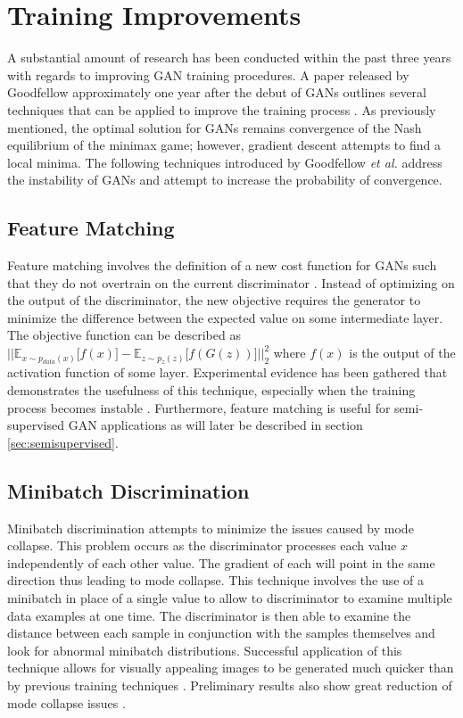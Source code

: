 \documentclass[11pt]{article}
\begin{document}
\section{Training Improvements}
A substantial amount of research has been conducted within the past three years with regards to improving GAN training procedures. A paper released by Goodfellow approximately one year after the debut of GANs outlines several techniques that can be applied to improve the training process \citep{2016arXiv160603498S}. As previously mentioned, the optimal solution for GANs remains convergence of the Nash equilibrium of the minimax game; however, gradient descent attempts to find a local minima. The following techniques introduced by Goodfellow \textit{et al.} address the instability of GANs and attempt to increase the probability of convergence.

\subsection{Feature Matching}
Feature matching involves the definition of a new cost function for GANs such that they do not overtrain on the current discriminator \citep{2016arXiv160603498S}. Instead of optimizing on the output of the discriminator, the new objective requires the generator to minimize the difference between the expected value on some intermediate layer. The objective function can be described as $\Big|\Big|\mathbb{E}_{x\sim p_{data}(x)}\Big[f(x)\Big] - \mathbb{E}_{z\sim p_{z}(z)}\Big[f(G(z))\Big]\Big|\Big|_2^2$ where $f(x)$ is the output of the activation function of some layer. Experimental evidence has been gathered that demonstrates the usefulness of this technique, especially when the training process becomes instable \citep{2016arXiv160603498S}. Furthermore, feature matching is useful for semi-supervised GAN applications as will later be described in section \ref{sec:semisupervised}.

\subsection{Minibatch Discrimination} \label{sec:minidisc}
Minibatch discrimination attempts to minimize the issues caused by mode collapse. This problem occurs as the discriminator processes each value $x$ independently of each other value. The gradient of each will point in the same direction thus leading to mode collapse. This technique involves the use of a minibatch in place of a single value to allow to discriminator to examine multiple data examples at one time. The discriminator is then able to examine the distance between each sample in conjunction with the samples themselves and look for abnormal minibatch distributions. Successful application of this technique allows for visually appealing images to be generated much quicker than by previous training techniques \citep{2016arXiv160603498S}. Preliminary results also show great reduction of mode collapse issues \citep{2017arXiv170100160G}.
\end{document}
